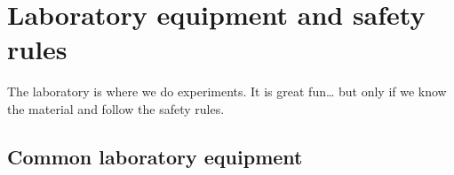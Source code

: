 %


\section{Laboratory equipment and safety rules}

The laboratory is where we do experiments. It is great fun\ldots{} but only if we know the material and follow the safety rules.

\subsection{Common laboratory equipment}

